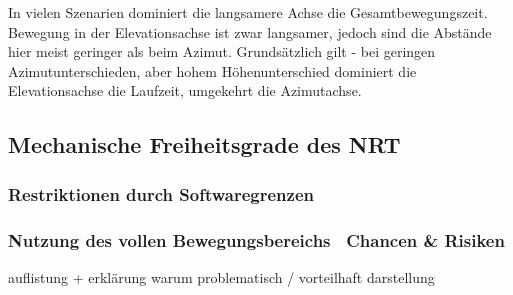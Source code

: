 In vielen Szenarien dominiert die langsamere Achse die Gesamtbewegungszeit. Bewegung in der Elevationsachse ist zwar langsamer, jedoch sind die Abstände hier meist geringer als beim Azimut.
Grundsätzlich gilt - bei geringen Azimutunterschieden, aber hohem Höhenunterschied dominiert die Elevationsachse die Laufzeit, umgekehrt die Azimutachse.

\subsection{Mechanische Freiheitsgrade des NRT}

\subsubsection{Restriktionen durch Softwaregrenzen}
\subsubsection{Nutzung des vollen Bewegungsbereichs \textendash~Chancen \& Risiken}

auflistung + erklärung warum problematisch / vorteilhaft
darstellung

